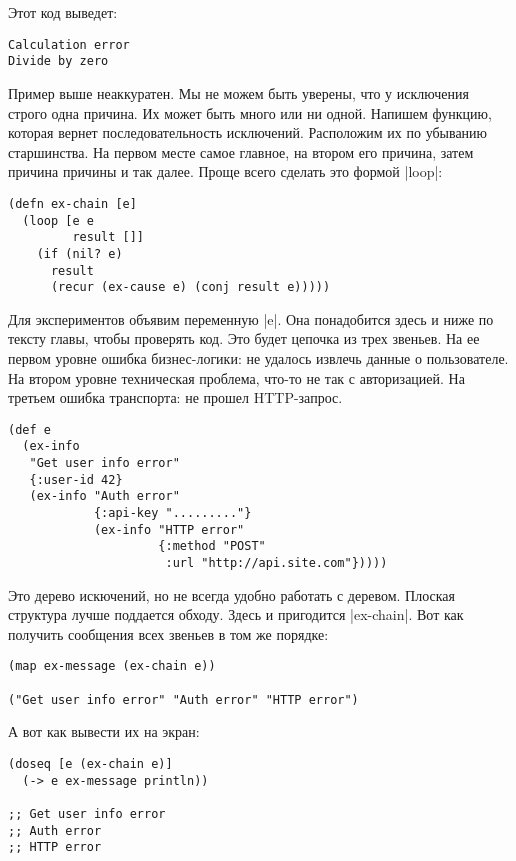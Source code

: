 \noindent
Этот код выведет:

\begin{verbatim}
Calculation error
Divide by zero
\end{verbatim}


Пример выше неаккуратен. Мы не можем быть уверены, что у исключения строго одна
причина. Их может быть много или ни одной. Напишем функцию, которая вернет
последовательность исключений. Расположим их по убыванию старшинства. На первом
месте самое главное, на втором его причина, затем причина причины и так
далее. Проще всего сделать это формой \spverb|loop|:

\begin{verbatim}
(defn ex-chain [e]
  (loop [e e
         result []]
    (if (nil? e)
      result
      (recur (ex-cause e) (conj result e)))))
\end{verbatim}

Для экспериментов объявим переменную \spverb|e|. Она понадобится здесь и ниже по тексту
главы, чтобы проверять код. Это будет цепочка из трех звеньев. На ее первом
уровне ошибка бизнес-логики: не удалось извлечь данные о пользователе. На втором
уровне техническая проблема, что-то не так с авторизацией. На третьем ошибка
транспорта: не прошел HTTP-запрос.

\begin{verbatim}
(def e
  (ex-info
   "Get user info error"
   {:user-id 42}
   (ex-info "Auth error"
            {:api-key "........."}
            (ex-info "HTTP error"
                     {:method "POST"
                      :url "http://api.site.com"}))))
\end{verbatim}

Это дерево искючений, но не всегда удобно работать с деревом. Плоская структура
лучше поддается обходу. Здесь и пригодится \spverb|ex-chain|. Вот как получить
сообщения всех звеньев в том же порядке:

\begin{verbatim}
(map ex-message (ex-chain e))

("Get user info error" "Auth error" "HTTP error")
\end{verbatim}

А вот как вывести их на экран:

\begin{verbatim}
(doseq [e (ex-chain e)]
  (-> e ex-message println))

;; Get user info error
;; Auth error
;; HTTP error
\end{verbatim}

